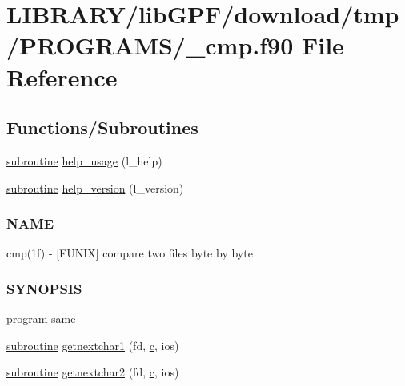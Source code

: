 \hypertarget{__cmp_8f90}{}\section{L\+I\+B\+R\+A\+R\+Y/lib\+G\+P\+F/download/tmp/\+P\+R\+O\+G\+R\+A\+M\+S/\+\_\+cmp.f90 File Reference}
\label{__cmp_8f90}
\subsection*{Functions/\+Subroutines}
\begin{DoxyCompactItemize}
\item 
\hyperlink{M__stopwatch_83_8txt_acfbcff50169d691ff02d4a123ed70482}{subroutine} \hyperlink{__cmp_8f90_a3e09a3b52ee8fb04eeb93fe5761626a8}{help\+\_\+usage} (l\+\_\+help)
\item 
\hyperlink{M__stopwatch_83_8txt_acfbcff50169d691ff02d4a123ed70482}{subroutine} \hyperlink{__cmp_8f90_a39c21619b08a3c22f19e2306efd7f766}{help\+\_\+version} (l\+\_\+version)
\begin{DoxyCompactList}\small\item\em \subsubsection*{N\+A\+ME}

cmp(1f) -\/ \mbox{[}F\+U\+N\+IX\mbox{]} compare two files byte by byte \subsubsection*{S\+Y\+N\+O\+P\+S\+IS}\end{DoxyCompactList}\item 
program \hyperlink{__cmp_8f90_a099b4c5d750b7bb116895dc4fca1bf38}{same}
\item 
\hyperlink{M__stopwatch_83_8txt_acfbcff50169d691ff02d4a123ed70482}{subroutine} \hyperlink{__cmp_8f90_a8bfff852996edc0f1e98b9ad7cd83dae}{getnextchar1} (fd, \hyperlink{c_8f90_aeb1f4e639be0213b4cbd07f2583a5b1f}{c}, ios)
\item 
\hyperlink{M__stopwatch_83_8txt_acfbcff50169d691ff02d4a123ed70482}{subroutine} \hyperlink{__cmp_8f90_acbf875fdb593609438c33f5b8182e7d4}{getnextchar2} (fd, \hyperlink{c_8f90_aeb1f4e639be0213b4cbd07f2583a5b1f}{c}, ios)
\end{DoxyCompactItemize}


